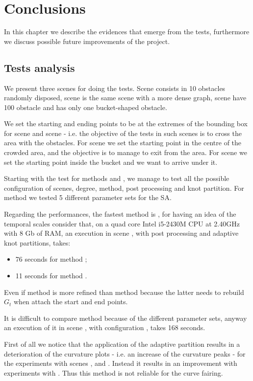 \documentclass[dissertation.tex]{subfiles}
\begin{document}
\chapter{Conclusions}\label{cha:conclusions}
In this chapter we describe the evidences that emerge from the tests,
furthermore we discuss possible future improvements of the project.

\section{Tests analysis}
We present three scenes for doing the tests. Scene \sceneA consists
in 10 obstacles randomly disposed, scene \sceneAb is the same scene
with a more dense graph, scene \sceneB have 100 obstacle and \sceneC has
only one bucket-shaped obstacle.

We set the starting and ending points
to be at the extremes of the bounding box for scene \sceneA and scene
\sceneAb - 
i.e. the objective of the tests in such scenes is to cross the area
with the obstacles. For scene \sceneB we set the starting point in the
centre of the crowded area, and the objective is to manage to exit
from the area. For scene \sceneC we set the starting point inside the bucket
and we want to arrive under it.

Starting with the test for methods \metA and \metB, we manage to test
all the possible configuration of scenes, degree, method, post
processing and knot partition. For method \metC we tested 5 different
parameter sets for the \ac{SA}.

Regarding the performances, the fastest method is \metB, for having an
idea of the temporal scales consider that, on a quad core Intel
i5-2430M CPU at 2.40GHz with 8 Gb of RAM, an execution in scene
\sceneA, with post processing and adaptive knot partitions, takes:
\begin{itemize}
\item 76 seconds for method \metA;
\item 11 seconds for method \metB.
\end{itemize}
Even if method \metB is more refined than method \metA because the
latter needs to rebuild $G_t$ when attach the start and end points.

It is difficult to compare method \metC because of the different
parameter sets, anyway an execution of it in scene \sceneA, with
configuration \annA, takes 168 seconds.

First of all we notice that the application of the adaptive partition
results in a deterioration of the curvature plots - i.e. an increase
of the curvature peaks - for the experiments with scenes \sceneA,
\sceneAb and \sceneB. Instead it results in an improvement with
experiments with \sceneC. Thus this method is not reliable for the
curve fairing.
\end{document}
